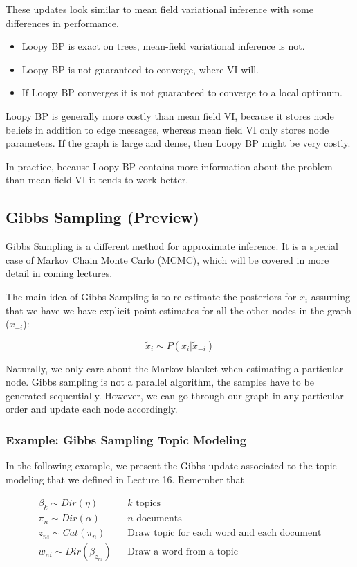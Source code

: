 \documentclass{article}
\begin{document}
These updates look similar to mean field variational inference with some differences in performance.
\begin{itemize}
	\item Loopy BP is exact on trees, mean-field variational inference is not.
	\item Loopy BP is not guaranteed to converge, where VI will.
	\item If Loopy BP converges it is not guaranteed to converge to a local optimum.
\end{itemize}
Loopy BP is generally more costly than mean field VI, because it stores node beliefs in addition to edge messages, whereas mean field VI only stores node parameters. If the graph is large and dense, then Loopy BP might be very costly. 

In practice, because Loopy BP contains more information about the problem than mean field VI it tends to work better.

\subsection{Gibbs Sampling (Preview)}

Gibbs Sampling is a different method for approximate inference. It is a special case of Markov Chain Monte Carlo (MCMC), which will be covered in more detail in coming lectures. 

The main idea of Gibbs Sampling is to re-estimate the posteriors for $x_i$ assuming that we have we have explicit point estimates for all the other nodes in the graph ($x_{-i}$):

$$\tilde{x}_i \sim P(x_{i} | \tilde{x}_{-i})$$

Naturally, we only care about the Markov blanket when estimating a particular node. Gibbs sampling is not a parallel algorithm, the samples have to be generated sequentially. However, we can go through our graph in any particular order and update each node accordingly. 

\subsubsection{Example: Gibbs Sampling Topic Modeling}

In the following example, we present the Gibbs update associated to the topic modeling that we defined in Lecture 16. Remember that 

\begin{align*}
\beta_k \sim Dir(\eta)& &k\text{ topics} \\
\pi_n \sim Dir(\alpha)& &n\text{ documents} \\
z_{ni} \sim Cat(\pi_n)& &\text{Draw topic for each word and each document} \\
w_{ni} \sim Dir(\beta_{z_{ni	}})& &\text{Draw a word from a topic} \\
\end{align*}
\end{document}

